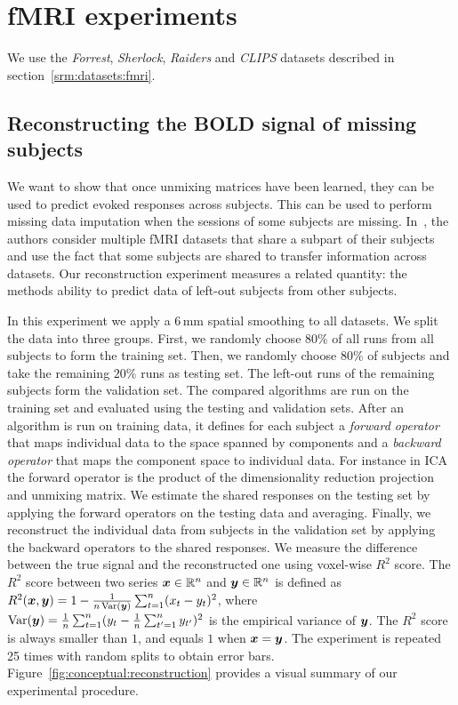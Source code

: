 \section{fMRI experiments}
We use the \emph{Forrest}, \emph{Sherlock}, \emph{Raiders} and \emph{CLIPS} datasets described in section~\ref{srm:datasets:fmri}.

\subsection{Reconstructing the BOLD signal of missing subjects}
\label{sec:srm:reconstruction}
\label{reconstruction}
We want to show that once unmixing matrices have been learned, they can be
used to predict evoked responses across subjects. This can be used to perform
missing data imputation when the sessions of some subjects are missing.
In~\cite{zhang2018transfer}, the authors consider multiple fMRI datasets that
share a subpart of their subjects and use the fact that some subjects are shared
to transfer information across datasets. Our reconstruction experiment measures
a related quantity: the methods ability to predict data of left-out subjects
from other subjects.

In this experiment we apply a 6\,mm spatial smoothing to all datasets. 
We split the data into three groups. First, we randomly choose $80\%$ of all runs from all subjects to form the training set.
%
Then, we randomly choose $80\%$ of subjects and take the remaining $20\%$  runs as testing set.
%
The left-out runs  of the remaining subjects form the validation set.
%
The compared algorithms are run on the training set and evaluated using the testing and validation sets.
%
After an algorithm is run on training data, it defines for each subject a \emph{forward operator} that maps individual data to the space spanned by components and a \emph{backward operator} that maps the component space to individual data. For instance in ICA the forward operator is the product of the dimensionality reduction projection and unmixing matrix.
%
We estimate the shared responses on the testing set by applying the forward operators on the testing data and averaging. Finally, we reconstruct the individual data from subjects in the validation set by applying the backward operators to the shared responses. We measure the difference between the true signal and the reconstructed one using voxel-wise $R^2$ score. The $R^2$ score between two series $\boldsymbol{x} \in \mathbb{R}^n$ and $\boldsymbol{y} \in \mathbb{R}^n$ is defined as
$R^2(\boldsymbol{x}, \boldsymbol{y}) = 1 - \frac1{n\operatorname*{Var}(\boldsymbol{y})}\sum_{t=1}^n (x_t - y_t)^2$, where $\operatorname*{Var}(\boldsymbol{y}) = \frac1n\sum_{t=1}^n (y_t - \frac1n \sum_{t'=1}^n y_{t'})^2$ is the empirical variance of $\boldsymbol{y}$.
%
The $R^2$ score is always smaller than $1$, and equals $1$ when $\boldsymbol{x}= \boldsymbol{y}$.
The experiment is repeated 25 times with random splits to obtain error bars.
Figure~\ref{fig:conceptual:reconstruction} provides a visual summary of our
experimental procedure.

